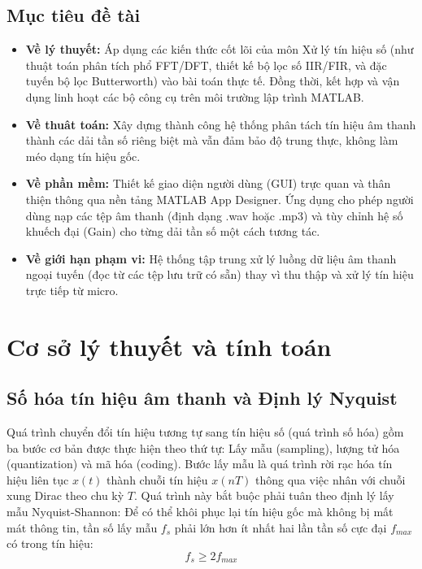 \documentclass[12pt,a4paper]{article}
\begin{document}
\subsection{Mục tiêu đề tài}
\begin{itemize}[label=$\bullet$]
    \item \textbf{Về lý thuyết:} Áp dụng các kiến thức cốt lõi của môn Xử lý tín hiệu số (như thuật toán phân tích phổ FFT/DFT, thiết kế bộ lọc số IIR/FIR, và đặc tuyến bộ lọc Butterworth) vào bài toán thực tế. Đồng thời, kết hợp và vận dụng linh hoạt các bộ công cụ trên môi trường lập trình MATLAB. 
    \item \textbf{Về thuât toán:} Xây dựng thành công hệ thống phân tách tín hiệu âm thanh thành các dải tần số riêng biệt mà vẫn đảm bảo độ trung thực, không làm méo dạng tín hiệu gốc.
    \item \textbf{Về phần mềm:} Thiết kế giao diện người dùng (GUI) trực quan và thân thiện thông qua nền tảng MATLAB App Designer. Ứng dụng cho phép người dùng nạp các tệp âm thanh (định dạng .wav hoặc .mp3) và tùy chỉnh hệ số khuếch đại (Gain) cho từng dải tần số một cách tương tác. 
    \item \textbf{Về giới hạn phạm vi:} Hệ thống tập trung xử lý luồng dữ liệu âm thanh ngoại tuyến (đọc từ các tệp lưu trữ có sẵn) thay vì thu thập và xử lý tín hiệu trực tiếp từ micro.
\end{itemize}

\section{Cơ sở lý thuyết và tính toán}

\subsection{Số hóa tín hiệu âm thanh và Định lý Nyquist}
Quá trình chuyển đổi tín hiệu tương tự sang tín hiệu số (quá trình số hóa) gồm ba bước cơ bản được thực hiện theo thứ tự: Lấy mẫu (sampling), lượng tử hóa (quantization) và mã hóa (coding). Bước lấy mẫu là quá trình rời rạc hóa tín hiệu liên tục $x(t)$ thành chuỗi tín hiệu $x(nT)$ thông qua việc nhân với chuỗi xung Dirac theo chu kỳ $T$. Quá trình này bắt buộc phải tuân theo định lý lấy mẫu Nyquist-Shannon: Để có thể khôi phục lại tín hiệu gốc mà không bị mất mát thông tin, tần số lấy mẫu $f_s$ phải lớn hơn ít nhất hai lần tần số cực đại $f_{max}$ có trong tín hiệu:
\begin{equation}
    f_s \geq 2f_{max}
\end{equation}
\end{document}
